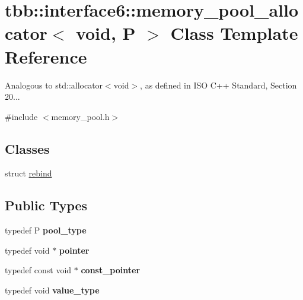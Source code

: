 \hypertarget{classtbb_1_1interface6_1_1memory__pool__allocator_3_01void_00_01P_01_4}{}\section{tbb\+:\+:interface6\+:\+:memory\+\_\+pool\+\_\+allocator$<$ void, P $>$ Class Template Reference}
\label{classtbb_1_1interface6_1_1memory__pool__allocator_3_01void_00_01P_01_4}


Analogous to std\+::allocator$<$void$>$, as defined in I\+S\+O C++ Standard, Section 20...  




{\ttfamily \#include $<$memory\+\_\+pool.\+h$>$}

\subsection*{Classes}
\begin{DoxyCompactItemize}
\item 
struct \hyperlink{structtbb_1_1interface6_1_1memory__pool__allocator_3_01void_00_01P_01_4_1_1rebind}{rebind}
\end{DoxyCompactItemize}
\subsection*{Public Types}
\begin{DoxyCompactItemize}
\item 
\hypertarget{classtbb_1_1interface6_1_1memory__pool__allocator_3_01void_00_01P_01_4_aa4a3be261ace6f19c3c40ef2503c4984}{}typedef P {\bfseries pool\+\_\+type}\label{classtbb_1_1interface6_1_1memory__pool__allocator_3_01void_00_01P_01_4_aa4a3be261ace6f19c3c40ef2503c4984}

\item 
\hypertarget{classtbb_1_1interface6_1_1memory__pool__allocator_3_01void_00_01P_01_4_afb58c3e8f2e0a8f9152eae641ee420fa}{}typedef void $\ast$ {\bfseries pointer}\label{classtbb_1_1interface6_1_1memory__pool__allocator_3_01void_00_01P_01_4_afb58c3e8f2e0a8f9152eae641ee420fa}

\item 
\hypertarget{classtbb_1_1interface6_1_1memory__pool__allocator_3_01void_00_01P_01_4_a5e53158493ed0d617460e8dd6534a525}{}typedef const void $\ast$ {\bfseries const\+\_\+pointer}\label{classtbb_1_1interface6_1_1memory__pool__allocator_3_01void_00_01P_01_4_a5e53158493ed0d617460e8dd6534a525}

\item 
\hypertarget{classtbb_1_1interface6_1_1memory__pool__allocator_3_01void_00_01P_01_4_a676a2c2649d6ffc45466d94555d71df2}{}typedef void {\bfseries value\+\_\+type}\label{classtbb_1_1interface6_1_1memory__pool__allocator_3_01void_00_01P_01_4_a676a2c2649d6ffc45466d94555d71df2}

\end{DoxyCompactItemize}
